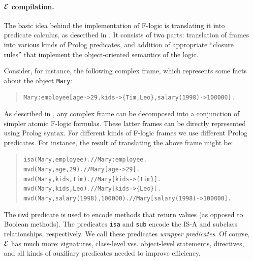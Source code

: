 \documentclass[11pt]{article}
\newcommand{\ERGO}{\mbox{\ensuremath{\cal{E}}\smaller{{\sc{RGO}}}}\xspace}
\newcommand{\FLSYSTEM}{\ERGO}
\newcommand{\fl}{\mbox{F-logic}\xspace}
\begin{document}
\paragraph{\FLSYSTEM compilation.}
The basic idea behind the implementation of \fl is translating it into
predicate calculus, as described in \cite{KLW95}. It consists of two parts:
translation of frames into various kinds of Prolog predicates, and
addition of appropriate ``closure rules'' that implement the
object-oriented semantics of the logic.

Consider, for instance, the following complex frame, which represents
some facts about the object \texttt{Mary}:

\begin{quote}
\begin{alltt}
Mary:employee[age->29, kids->\{Tim,Leo\}, salary(1998)->100000].
\end{alltt}
\end{quote}

As described in \cite{KLW95}, any complex frame can be
decomposed into a conjunction of simpler atomic \fl formulas. These
latter frames can be directly represented using Prolog syntax.  For
different kinds of \fl frames we use different Prolog predicates. For
instance, the result of translating the above frame might be:

\begin{quote}
\begin{alltt}
isa(Mary,employee).            // Mary:employee. 
mvd(Mary,age,29).               // Mary[age->29].
mvd(Mary,kids,Tim).            // Mary[kids->\{Tim\}].
mvd(Mary,kids,Leo).            // Mary[kids->\{Leo\}].
mvd(Mary,salary(1998),100000).  // Mary[salary(1998)->100000].
\end{alltt}
\end{quote}

The {\tt mvd} predicate is used to encode methods that return values (as
opposed to Boolean methods).
The predicates {\tt isa} and {\tt sub}
encode the IS-A and subclass relationships, respectively.
We call these predicates \emph{wrapper predicates}. 
Of course, \FLSYSTEM has much more: signatures, class-level
vss. object-level
statements, directives, and all kinds of auxiliary predicates
needed to improve efficiency.
\end{document}
